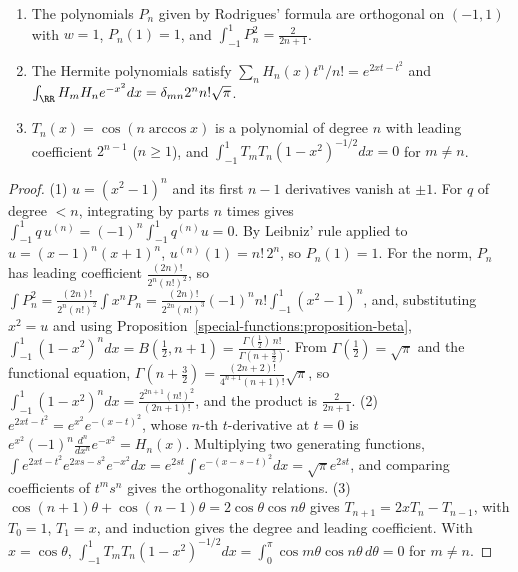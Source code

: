 \begin{proposition}\label{special-functions:proposition-legendre-hermite}
\begin{enumerate}
\item The polynomials $P_n$ given by Rodrigues' formula are orthogonal on $(-1, 1)$ with $w = 1$, $P_n(1) = 1$, and $\int_{-1}^1P_n^2 = \frac{2}{2n + 1}$.
\item The Hermite polynomials satisfy $\sum_nH_n(x)t^n/n! = e^{2xt - t^2}$ and $\int_\RR H_mH_ne^{-x^2}dx = \delta_{mn}2^nn!\sqrt{\pi}$.
\item $T_n(x) = \cos(n\arccos x)$ is a polynomial of degree $n$ with leading coefficient $2^{n-1}$ ($n \geq 1$), and $\int_{-1}^1T_mT_n(1 - x^2)^{-1/2}dx = 0$ for $m \neq n$.
\end{enumerate}
\end{proposition}

\begin{proof}
(1) $u = (x^2 - 1)^n$ and its first $n - 1$ derivatives vanish at $\pm 1$. For $q$ of degree $< n$, integrating by parts $n$ times gives $\int_{-1}^1q\,u^{(n)} = (-1)^n\int_{-1}^1q^{(n)}u = 0$. By Leibniz' rule applied to
$u = (x - 1)^n(x + 1)^n$, $u^{(n)}(1) = n!\,2^n$, so $P_n(1) = 1$. For the norm, $P_n$ has leading coefficient $\frac{(2n)!}{2^n(n!)^2}$, so $\int P_n^2 = \frac{(2n)!}{2^n(n!)^2}\int x^nP_n = \frac{(2n)!}{2^{2n}(n!)^3}(-1)^nn!\int_{-1}^1(x^2 - 1)^n$,
and, substituting $x^2 = u$ and using Proposition~\ref{special-functions:proposition-beta}, $\int_{-1}^1(1 - x^2)^ndx = B(\frac12, n + 1) = \frac{\Gamma(\frac12)\,n!}{\Gamma(n + \frac32)}$. From $\Gamma(\frac12) = \sqrt\pi$
and the functional equation, $\Gamma(n + \frac32) = \frac{(2n + 2)!}{4^{n+1}(n + 1)!}\sqrt\pi$, so $\int_{-1}^1(1 - x^2)^ndx = \frac{2^{2n+1}(n!)^2}{(2n + 1)!}$, and the product is $\frac{2}{2n + 1}$.
(2) $e^{2xt - t^2} = e^{x^2}e^{-(x - t)^2}$, whose $n$-th $t$-derivative at $t = 0$ is $e^{x^2}(-1)^n\frac{d^n}{dx^n}e^{-x^2} = H_n(x)$. Multiplying two generating functions,
$\int e^{2xt - t^2}e^{2xs - s^2}e^{-x^2}dx = e^{2st}\int e^{-(x - s - t)^2}dx = \sqrt{\pi}e^{2st}$, and comparing coefficients of $t^ms^n$ gives the orthogonality relations.
(3) $\cos(n + 1)\theta + \cos(n - 1)\theta = 2\cos\theta\cos n\theta$ gives $T_{n+1} = 2xT_n - T_{n-1}$, with $T_0 = 1$, $T_1 = x$, and induction gives the degree and leading coefficient. With $x = \cos\theta$,
$\int_{-1}^1T_mT_n(1 - x^2)^{-1/2}dx = \int_0^\pi\cos m\theta\cos n\theta\,d\theta = 0$ for $m \neq n$.
\end{proof}

